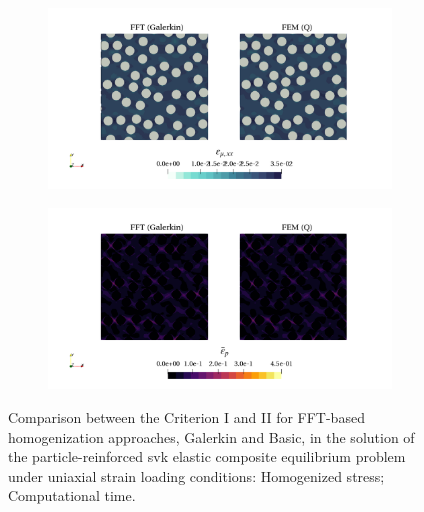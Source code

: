 \begin{figure}[hbt]
\centering
	\begin{subfigure}[b]{\textwidth}
    \centering
    \includegraphics[width=\textwidth]{figures/von_mises_small_strain_2D_normal_strain_11}
    \caption{}
    \label{subfig:svk_2D_ratio_4_normal_strain_11}
  \end{subfigure}
  \begin{subfigure}[b]{\textwidth}
    \centering
    \includegraphics[width=\textwidth]{figures/von_mises_small_strain_2D_normal_e_p}
    \caption{}
    \label{subfig:svk_2D_ratio_-4_normal_strain_11}
  \end{subfigure}
\caption{Comparison between the Criterion I and II for FFT-based homogenization approaches, Galerkin and Basic, in the
solution of the particle-reinforced svk elastic composite equilibrium problem under uniaxial
strain loading conditions:  Homogenized stress;  Computational time.}
\label{fig:svk_3D_normal_comparison_crit}
\end{figure}
